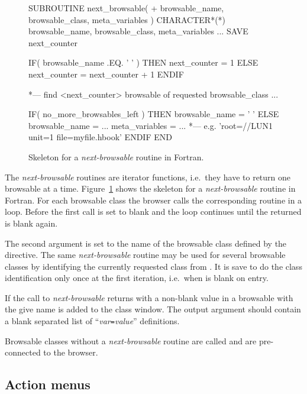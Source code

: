 \begin{figure}[tb]
\begin{XMP}
      SUBROUTINE next_browsable(
     +   browsable_name, browsable_class, meta_variables )
      CHARACTER*(*) browsable_name, browsable_class, meta_variables
         ...
      SAVE next_counter

      IF( browsable_name .EQ. ' ' ) THEN
         next_counter = 1
      ELSE
         next_counter = next_counter + 1
      ENDIF

*--- find <next_counter> browsable of requested browsable_class
         ...

      IF( no_more_browsables_left ) THEN
         browsable_name = ' '
      ELSE
         browsable_name = ...
         meta_variables = ...
*--- e.g. 'root=//LUN1 unit=1 file=myfile.hbook'
      ENDIF
      END
\end{XMP}
\caption{Skeleton for a \textsl{next-browsable} routine in Fortran.
\label{fig-next-browsable}}
\end{figure}

The \textsl{next-browsable} routines are iterator functions, i.e.\ they
have to return one browsable at a time.
Figure~\ref{fig-next-browsable} shows the skeleton for a 
\textsl{next-browsable} routine in Fortran.
For each browsable class the browser calls the corresponding routine
in a loop. 
Before the first call  is set to blank and the
loop continues until the returned  is blank again.

The second argument  is set to the name of the
browsable class defined by the  directive.
The same \textsl{next-browsable} routine may be used for several
browsable classes by identifying the currently requested class from
. 
It is save to do the class identification only once at the first iteration,
i.e.\ when  is blank on entry.

If the call to \textsl{next-browsable} returns with a non-blank value in
 a browsable with the give name is added to the
class window.
The output argument  should contain a blank
separated list of ``\textsl{var}\texttt{=}\textsl{value}'' 
definitions. 



Browsable classes without a \textsl{next-browsable} routine are called
 and are pre-connected to the browser.


\subsection{Action menus}

